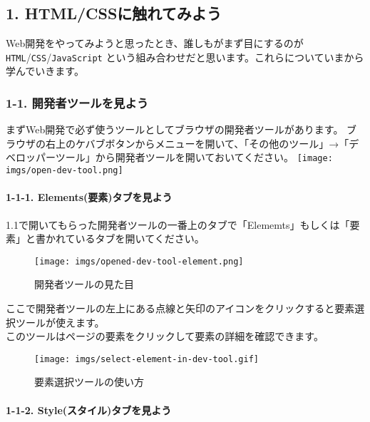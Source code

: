\subsection{1.
HTML/CSSに触れてみよう}\label{htmlcssux306bux89e6ux308cux3066ux307fux3088ux3046}

Web開発をやってみようと思ったとき、誰しもがまず目にするのが
\texttt{HTML}/\texttt{CSS}/\texttt{JavaScript}
という組み合わせだと思います。これらについていまから学んでいきます。

\subsubsection{1-1.
開発者ツールを見よう}\label{ux958bux767aux8005ux30c4ux30fcux30ebux3092ux898bux3088ux3046}

まずWeb開発で必ず使うツールとしてブラウザの開発者ツールがあります。
ブラウザの右上のケバブボタンからメニューを開いて、「その他のツール」→「デベロッパーツール」から開発者ツールを開いておいてください。
\texttt{[image: imgs/open-dev-tool.png]}

\paragraph{1-1-1.
Elements(要素)タブを見よう}\label{elementsux8981ux7d20ux30bfux30d6ux3092ux898bux3088ux3046}

1.1で開いてもらった開発者ツールの一番上のタブで「Elememts」もしくは「要素」と書かれているタブを開いてください。

\begin{figure}
\centering
\texttt{[image: imgs/opened-dev-tool-element.png]}
\caption{開発者ツールの見た目}
\end{figure}

ここで開発者ツールの左上にある点線と矢印のアイコンをクリックすると要素選択ツールが使えます。\\
このツールはページの要素をクリックして要素の詳細を確認できます。

\begin{figure}
\centering
\texttt{[image: imgs/select-element-in-dev-tool.gif]}
\caption{要素選択ツールの使い方}
\end{figure}

\paragraph{1-1-2.
Style(スタイル)タブを見よう}\label{styleux30b9ux30bfux30a4ux30ebux30bfux30d6ux3092ux898bux3088ux3046}

